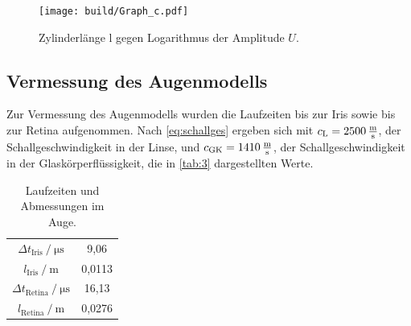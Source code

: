 \begin{figure}[H]
    \centering
    \texttt{[image: build/Graph\_c.pdf]}
    \caption{Zylinderlänge l gegen Logarithmus der Amplitude $U$.}
    \label{fig:graph2}
\end{figure}


\subsection{Vermessung des Augenmodells}

Zur Vermessung des Augenmodells wurden die Laufzeiten bis zur Iris sowie bis zur Retina aufgenommen.
Nach \eqref{eq:schallges} ergeben sich mit $c_\text{L} = 2500 \,\unit{\frac{\meter}{\second}}$, der Schallgeschwindigkeit in der Linse, und
$c_\text{GK} = 1410 \,\unit{\frac{\meter}{\second}}$, der Schallgeschwindigkeit in der Glaskörperflüssigkeit, die in \autoref{tab:3} dargestellten Werte.


\begin{table}
    \centering
    \caption{Laufzeiten und Abmessungen im Auge.}
    \label{tab:3} 
    \begin{tabular}{| c | c |}
    \hline 
    {$\Delta t_\text{Iris} \mathbin{/} \unit{\micro\second}$}    &       9,06   \\
    {$l_\text{Iris} \mathbin{/} \unit{\meter}$}                  &       0,0113 \\
    {$\Delta t_\text{Retina} \mathbin{/} \unit{\micro\second}$}  &      16,13   \\
    {$l_\text{Retina} \mathbin{/} \unit{\meter}$}                &       0,0276 \\
    \hline
    \end{tabular}  
\end{table}